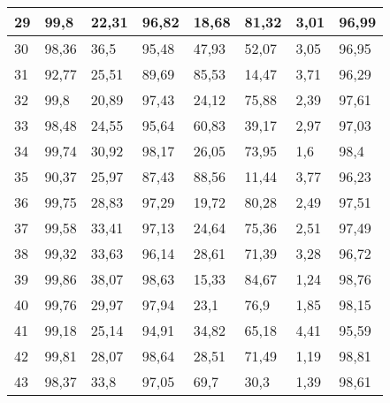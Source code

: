 \begin{longtable}[c]{|l|l|l|l|l|l|l|l|}
29              & 99,8         & 22,31        & 96,82       & 18,68         & 81,32         & 3,01          & 96,99         \\ \hline
30              & 98,36        & 36,5         & 95,48       & 47,93         & 52,07         & 3,05          & 96,95         \\ \hline
31              & 92,77        & 25,51        & 89,69       & 85,53         & 14,47         & 3,71          & 96,29         \\ \hline
32              & 99,8         & 20,89        & 97,43       & 24,12         & 75,88         & 2,39          & 97,61         \\ \hline
33              & 98,48        & 24,55        & 95,64       & 60,83         & 39,17         & 2,97          & 97,03         \\ \hline
34              & 99,74        & 30,92        & 98,17       & 26,05         & 73,95         & 1,6           & 98,4          \\ \hline
35              & 90,37        & 25,97        & 87,43       & 88,56         & 11,44         & 3,77          & 96,23         \\ \hline
36              & 99,75        & 28,83        & 97,29       & 19,72         & 80,28         & 2,49          & 97,51         \\ \hline
37              & 99,58        & 33,41        & 97,13       & 24,64         & 75,36         & 2,51          & 97,49         \\ \hline
38              & 99,32        & 33,63        & 96,14       & 28,61         & 71,39         & 3,28          & 96,72         \\ \hline
39              & 99,86        & 38,07        & 98,63       & 15,33         & 84,67         & 1,24          & 98,76         \\ \hline
40              & 99,76        & 29,97        & 97,94       & 23,1          & 76,9          & 1,85          & 98,15         \\ \hline
41              & 99,18        & 25,14        & 94,91       & 34,82         & 65,18         & 4,41          & 95,59         \\ \hline
42              & 99,81        & 28,07        & 98,64       & 28,51         & 71,49         & 1,19          & 98,81         \\ \hline
43              & 98,37        & 33,8         & 97,05       & 69,7          & 30,3          & 1,39          & 98,61         \\ \hline

\end{longtable}
